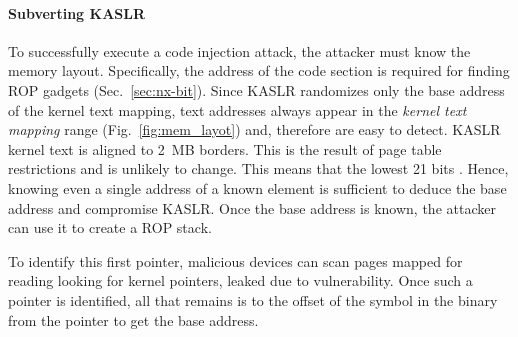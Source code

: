 

\paragraph{Subverting KASLR}
To successfully execute a code injection attack, the attacker must know the memory layout. Specifically, the address of the code section is required for finding ROP gadgets (Sec.~\ref{sec:nx-bit}). 
Since KASLR randomizes only the base address of the kernel text mapping, text addresses always appear in the \textit{kernel text mapping} range (Fig.~\ref{fig:mem_layot}) and, therefore are easy to detect. KASLR kernel text is aligned to 2~MB borders. This is the result of page table restrictions and is unlikely to change. This means that the lowest 21 bits \DIFdelbegin {}\DIFdelend \DIFaddbegin {}\DIFaddend . Hence, knowing even a single address of a known element is sufficient to deduce the base address and compromise KASLR. Once the base address is known, the attacker can use it to create a ROP stack.

To identify this first pointer, malicious devices can scan pages mapped for reading looking for kernel pointers, leaked due to \subpage{} vulnerability. Once such a pointer is identified, all that remains is to \DIFdelbegin {}\DIFdelend \DIFaddbegin {}\DIFaddend the offset of the symbol in the binary from the pointer to get the base address.%

